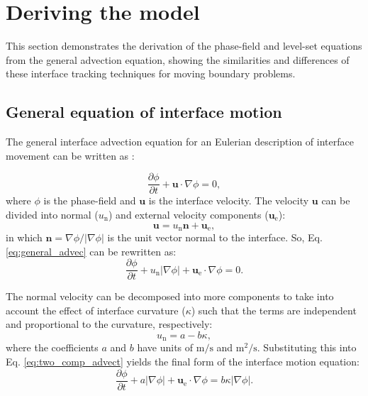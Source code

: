 \section{Deriving the model}

This section demonstrates the derivation of the phase-field and level-set equations from the general advection equation, showing the similarities and differences of these interface tracking techniques for moving boundary problems.

\subsection{General equation of interface motion}

The general interface advection equation for an Eulerian description of interface movement can be written as \cite{Sun2007}:

\begin{equation} \label{eq:general_advec}
\frac{\partial \phi}{\partial t}+\boldsymbol{u} \cdot \nabla \phi=0,
\end{equation}
where $\phi$ is the phase-field and $\boldsymbol{u}$ is the interface velocity. The velocity $\boldsymbol{u}$ can be divided into normal ($u_{\mathrm{n}}$) and external velocity components ($\boldsymbol{u}_{\mathrm{e}}$):
\begin{equation} \label{eq:two_comp_advect}
\boldsymbol{u}=u_{\mathrm{n}} \boldsymbol{n}+\boldsymbol{u}_{\mathrm{e}},
\end{equation}
in which $\boldsymbol{n}=\nabla \phi /|\nabla \phi|$ is the unit vector normal to the interface. So, Eq. \ref{eq:general_advec} can be rewritten as:
\begin{equation}
\frac{\partial \phi}{\partial t}+u_{\mathrm{n}}|\nabla \phi|+\boldsymbol{u}_{\mathrm{e}} \cdot \nabla \phi=0.
\end{equation}

The normal velocity can be decomposed into more components to take into account the effect of interface curvature ($\kappa$) such that the terms are independent and proportional to the curvature, respectively:
\begin{equation}
u_{\mathrm{n}} = a - b \kappa,
\end{equation}
where the coefficients $a$ and $b$ have units of $\mathrm{m}/\mathrm{s}$ and $\mathrm{m}^2/\mathrm{s}$. Substituting this into Eq. \ref{eq:two_comp_advect}  yields the final form of the interface motion equation:
\begin{equation} \label{eq:advect_kappa}
\frac{\partial \phi}{\partial t}+a|\nabla \phi|+\boldsymbol{u}_{\mathrm{e}} \cdot \nabla \phi=b \kappa|\nabla \phi|.
\end{equation}


